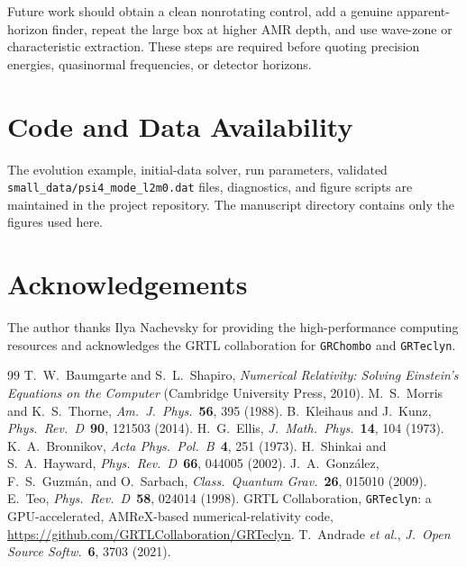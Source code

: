 \documentclass[twocolumn,aps,prd,nofootinbib,natbib]{revtex4-2}
\begin{document}
Future work should obtain a clean nonrotating control, add a genuine
apparent-horizon finder, repeat the large box at higher AMR depth, and use
wave-zone or characteristic extraction. These steps are required before quoting
precision energies, quasinormal frequencies, or detector horizons.

\section{Code and Data Availability}
The evolution example, initial-data solver, run parameters, validated
\texttt{small\_data/psi4\_mode\_l2m0.dat} files, diagnostics, and figure scripts
are maintained in the project repository. The manuscript directory contains
only the figures used here.

\section{Acknowledgements}
The author thanks Ilya Nachevsky for providing the high-performance computing
resources and acknowledges the GRTL collaboration for \texttt{GRChombo} and
\texttt{GRTeclyn}.

\begin{thebibliography}{99}
 T.~W.~Baumgarte and S.~L.~Shapiro,
\textit{Numerical Relativity: Solving Einstein's Equations on the Computer}
(Cambridge University Press, 2010).
 M.~S.~Morris and K.~S.~Thorne,
\textit{Am.\ J.\ Phys.}\ \textbf{56}, 395 (1988).
 B.~Kleihaus and J.~Kunz,
\textit{Phys.\ Rev.\ D}\ \textbf{90}, 121503 (2014).
 H.~G.~Ellis, \textit{J.\ Math.\ Phys.}\ \textbf{14}, 104 (1973).
 K.~A.~Bronnikov, \textit{Acta Phys.\ Pol.\ B}\ \textbf{4},
251 (1973).
 H.~Shinkai and S.~A.~Hayward,
\textit{Phys.\ Rev.\ D}\ \textbf{66}, 044005 (2002).
 J.~A.~Gonz\'alez, F.~S.~Guzm\'an, and O.~Sarbach,
\textit{Class.\ Quantum Grav.}\ \textbf{26}, 015010 (2009).
 E.~Teo, \textit{Phys.\ Rev.\ D}\ \textbf{58}, 024014 (1998).
 GRTL Collaboration, \texttt{GRTeclyn}: a GPU-accelerated,
AMReX-based numerical-relativity code,
\url{https://github.com/GRTLCollaboration/GRTeclyn}.
 T.~Andrade \textit{et al.},
\textit{J.\ Open Source Softw.}\ \textbf{6}, 3703 (2021).
\end{thebibliography}
\end{document}
